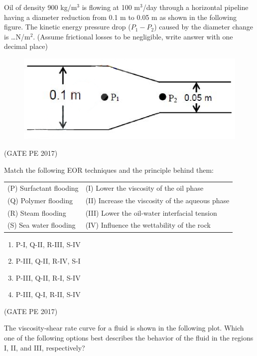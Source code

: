 \documentclass[journal,12pt,onecolumn]{IEEEtran}
\theoremstyle{remark}
\begin{document}
\begin{enumerate}
{\item Oil of density 900 kg/m$^3$ is flowing at 100 m$^3$/day through a horizontal pipeline having a diameter reduction from 0.1 m to 0.05 m as shown in the following figure.
The kinetic energy pressure drop ($P_1 - P_2$) caused by the diameter change is \dots N/m$^2$.
(Assume frictional losses to be negligible, write answer with one decimal place)\\
\begin{figure}[h]
    \centering
    \includegraphics[width=0.5\columnwidth]{figQ_39.png}
\end{figure}
\hfill{(GATE PE 2017)}

\item Match the following EOR techniques and the principle behind them:\\

\begin{tabular}{ll}
(P) Surfactant flooding & (I) Lower the viscosity of the oil phase \\
(Q) Polymer flooding & (II) Increase the viscosity of the aqueous phase \\
(R) Steam flooding & (III) Lower the oil-water interfacial tension \\
(S) Sea water flooding & (IV) Influence the wettability of the rock \\
\end{tabular}
\begin{enumerate}
\item P-I, Q-II, R-III, S-IV \\
\item P-III, Q-II, R-IV, S-I \\
\item P-III, Q-II, R-I, S-IV \\
\item P-III, Q-I, R-II, S-IV
\end{enumerate}
\hfill{(GATE PE 2017)}

\item The viscosity-shear rate curve for a fluid is shown in the following plot. Which one of the following options best describes the behavior of the fluid in the regions I, II, and III, respectively?

}
\end{enumerate}
\end{document}
